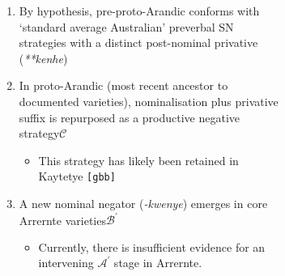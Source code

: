 \begin{figure}[H]
	\caption[Hypothesised reconstruction of the Arandic negative domain]{Summary of reconstructed changes in the Arandic negative domain in terms of NEC stages $ (\mathcal{A,B,C}) $}\label{arandic}
	\begin{subfigure}{.4\textwidth}
\end{subfigure}
\begin{subfigure}{.68\textwidth}
	\begin{enumerate}[\bf i]
		\item By hypothesis, pre-proto-Arandic conforms with `standard average Australian' preverbal SN strategies with a distinct post-nominal privative (\textit{**kenhe})
		\item In proto-Arandic (most recent ancestor to documented varieties), nominalisation plus privative suffix is repurposed as a productive negative strategy\hfill$\boldsymbol{\mathcal C}$
		\begin{itemize}
			\item This strategy has likely been retained in Kaytetye \texttt{[gbb]}
		\end{itemize}
		\item A new nominal negator (\textit{-kwenye}) emerges in core Arrernte varieties\hfill$\boldsymbol{\mathcal{B^\prime}}$
		\begin{itemize}
			\item Currently, there is insufficient evidence for an intervening $\boldsymbol{\mathcal{A^\prime}}$ stage in Arrernte.
		\end{itemize}	
	\end{enumerate}
\end{subfigure}
\end{figure}

